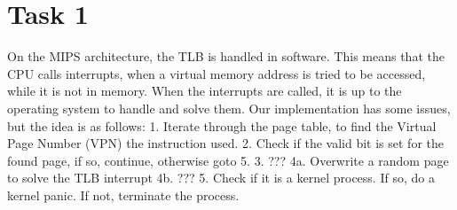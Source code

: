 \documentclass[11pt]{article}
\begin{document}

\clearpage
\maketitle
\thispagestyle{empty}

\newpage




\section*{Task 1}
On the MIPS architecture, the TLB is handled in software. This means that the CPU calls interrupts, when a virtual memory address is tried to be accessed, while it is not in memory. When the interrupts are called, it is up to the operating system to handle and solve them.
Our implementation has some issues, but the idea is as follows: 
1. Iterate through the page table, to find the Virtual Page Number (VPN) the instruction used.
2. Check if the valid bit is set for the found page, if so, continue, otherwise goto 5.
3. ???
4a. Overwrite a random page to solve the TLB interrupt
4b. ???
5. Check if it is a kernel process. If so, do a kernel panic. If not, terminate the process.
\end{document}
